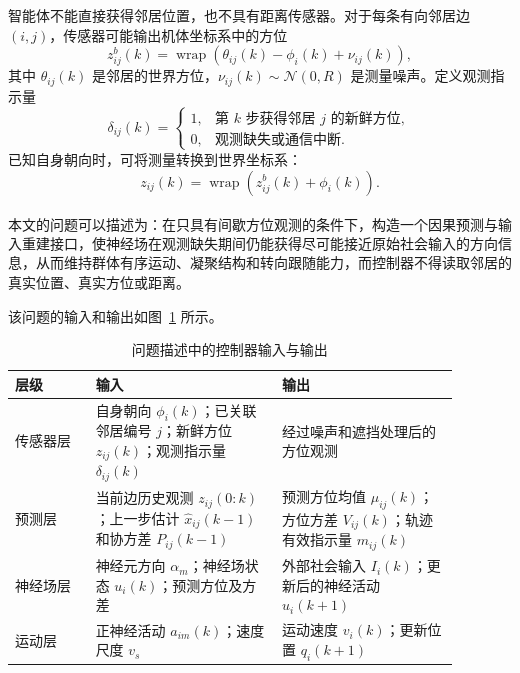 \documentclass[UTF8,fontset=windows,11pt]{ctexart}
\newcommand{\upcite}[1]{\textsuperscript{\cite{#1}}}
\begin{document}
智能体不能直接获得邻居位置，也不具有距离传感器。对于每条有向邻居边 $(i,j)$，传感器可能输出机体坐标系中的方位
\begin{equation}
 z^b_{ij}(k)=
 \operatorname{wrap}\left(\theta_{ij}(k)-\phi_i(k)+\nu_{ij}(k)\right),
\end{equation}
其中 $\theta_{ij}(k)$ 是邻居的世界方位，$\nu_{ij}(k)\sim\mathcal N(0,R)$ 是测量噪声。定义观测指示量
\begin{equation}
 \delta_{ij}(k)=
 \begin{cases}
 1, & \text{第 $k$ 步获得邻居 $j$ 的新鲜方位},\\
 0, & \text{观测缺失或通信中断}.
 \end{cases}
\end{equation}
已知自身朝向时，可将测量转换到世界坐标系：
\begin{equation}
 z_{ij}(k)=\operatorname{wrap}(z^b_{ij}(k)+\phi_i(k)).
\end{equation}

本文的问题可以描述为：在只具有间歇方位观测的条件下\upcite{Xiourouppa2025}，构造一个因果预测与输入重建接口，使神经场在观测缺失期间仍能获得尽可能接近原始社会输入的方向信息，从而维持群体有序运动、凝聚结构和转向跟随能力，而控制器不得读取邻居的真实位置、真实方位或距离。

该问题的输入和输出如图~\ref{tab:problem_io} 所示。

\begin{table}[htbp]
 \centering
 \small
 \caption{问题描述中的控制器输入与输出}
 \label{tab:problem_io}
 \begin{tabular}{>{\raggedright\arraybackslash}p{0.16\linewidth}
                 >{\raggedright\arraybackslash}p{0.37\linewidth}
                 >{\raggedright\arraybackslash}p{0.35\linewidth}}
 \toprule
 层级 & 输入 & 输出\\
 \midrule
 传感器层 &
 自身朝向 $\phi_i(k)$；已关联邻居编号 $j$；新鲜方位 $z_{ij}(k)$；观测指示量 $\delta_{ij}(k)$ &
 经过噪声和遮挡处理后的方位观测\\
 预测层 &
 当前边历史观测 $z_{ij}(0:k)$；上一步估计 $\hat x_{ij}(k-1)$ 和协方差 $P_{ij}(k-1)$ &
 预测方位均值 $\mu_{ij}(k)$；方位方差 $V_{ij}(k)$；轨迹有效指示量 $m_{ij}(k)$\\
 神经场层 &
 神经元方向 $\alpha_m$；神经场状态 $u_i(k)$；预测方位及方差 &
 外部社会输入 $I_i(k)$；更新后的神经活动 $u_i(k+1)$\\
 运动层 &
 正神经活动 $a_{im}(k)$；速度尺度 $v_s$ &
 运动速度 $v_i(k)$；更新位置 $q_i(k+1)$\\
 \bottomrule
 \end{tabular}
\end{table}
\end{document}
